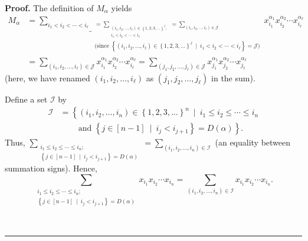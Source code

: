 \documentclass[numbers=enddot,12pt,final,onecolumn,notitlepage,abstracton]{scrartcl}
\theoremstyle{definition}
\newenvironment{proof}[1][Proof]{\noindent\textbf{#1.} }{\ \rule{0.5em}{0.5em}}
\let\sumnonlimits\sum
\renewcommand{\sum}{\sumnonlimits\limits}
\newenvironment{verlong}{}{}
\begin{document}
\begin{verlong}
\begin{footnotesize}
\begin{proof}
The definition of $M_{\alpha}$ yields%
\begin{align}
M_{\alpha}  &  =\underbrace{\sum_{i_{1}<i_{2}<\cdots<i_{\ell}}}%
_{\substack{=\sum_{\substack{\left(  i_{1},i_{2},\ldots,i_{\ell}\right)
\in\left\{  1,2,3,\ldots\right\}  ^{\ell};\\i_{1}<i_{2}<\cdots<i_{\ell}}%
}=\sum_{\left(  i_{1},i_{2},\ldots,i_{\ell}\right)  \in\mathcal{J}%
}\\\text{(since }\left\{  \left(  i_{1},i_{2},\ldots,i_{\ell}\right)
\in\left\{  1,2,3,\ldots\right\}  ^{\ell}\ \mid\ i_{1}<i_{2}<\cdots<i_{\ell
}\right\}  =\mathcal{J}\text{)}}}x_{i_{1}}^{\alpha_{1}}x_{i_{2}}^{\alpha_{2}%
}\cdots x_{i_{\ell}}^{\alpha_{\ell}}\nonumber\\
&  =\sum_{\left(  i_{1},i_{2},\ldots,i_{\ell}\right)  \in\mathcal{J}}x_{i_{1}%
}^{\alpha_{1}}x_{i_{2}}^{\alpha_{2}}\cdots x_{i_{\ell}}^{\alpha_{\ell}}%
=\sum_{\left(  j_{1},j_{2},\ldots,j_{\ell}\right)  \in\mathcal{J}}x_{j_{1}%
}^{\alpha_{1}}x_{j_{2}}^{\alpha_{2}}\cdots x_{j_{\ell}}^{\alpha_{\ell}}
\label{pf.prop.Malpha.D.Malpha=}%
\end{align}
(here, we have renamed $\left(  i_{1},i_{2},\ldots,i_{\ell}\right)  $ as
$\left(  j_{1},j_{2},\ldots,j_{\ell}\right)  $ in the sum).

Define a set $\mathcal{I}$ by%
\begin{align}
\mathcal{I}  &  =\left\{  \left(  i_{1},i_{2},\ldots,i_{n}\right)  \in\left\{
1,2,3,\ldots\right\}  ^{n}\ \mid\ i_{1}\leq i_{2}\leq\cdots\leq i_{n}\right.
\nonumber\\
&  \ \ \ \ \ \ \ \ \ \ \left.  \text{and }\left\{  j\in\left[  n-1\right]
\ \mid\ i_{j}<i_{j+1}\right\}  =D\left(  \alpha\right)  \right\}  .
\label{pf.prop.Malpha.D.I=}%
\end{align}
Thus, $\sum_{\substack{i_{1}\leq i_{2}\leq\cdots\leq i_{n};\\\left\{
j\in\left[  n-1\right]  \ \mid\ i_{j}<i_{j+1}\right\}  =D\left(
\alpha\right)  }}=\sum_{\left(  i_{1},i_{2},\ldots,i_{n}\right)
\in\mathcal{I}}$ (an equality between summation signs). Hence,%
\begin{equation}
\sum_{\substack{i_{1}\leq i_{2}\leq\cdots\leq i_{n};\\\left\{  j\in\left[
n-1\right]  \ \mid\ i_{j}<i_{j+1}\right\}  =D\left(  \alpha\right)  }%
}x_{i_{1}}x_{i_{2}}\cdots x_{i_{n}}=\sum_{\left(  i_{1},i_{2},\ldots
,i_{n}\right)  \in\mathcal{I}}x_{i_{1}}x_{i_{2}}\cdots x_{i_{n}}.
\label{pf.prop.Malpha.D.RHS=}%
\end{equation}



\end{proof}
\end{footnotesize}
\end{verlong}
\end{document}
